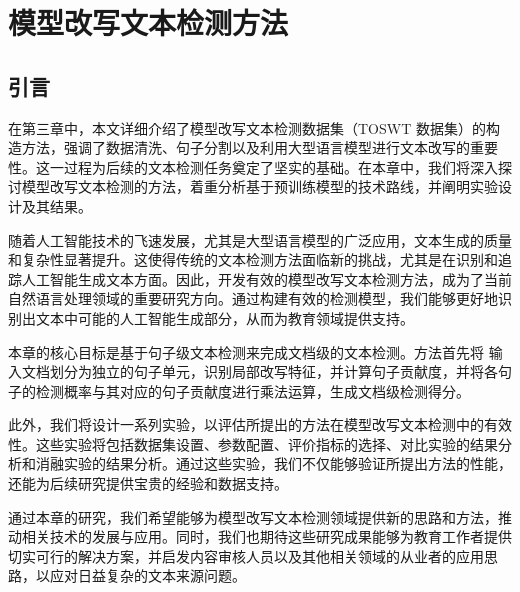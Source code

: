 
\chapter{模型改写文本检测方法}
\label{chap:method}

\section{引言}
\label{sec:method-intro}

在第三章中，本文详细介绍了模型改写文本检测数据集（TOSWT 数据集）的构造方法，强调了数据清洗、句子分割以及利用大型语言模型进行文本改写的重要性。这一过程为后续的文本检测任务奠定了坚实的基础。在本章中，我们将深入探讨模型改写文本检测的方法，着重分析基于预训练模型的技术路线，并阐明实验设计及其结果。

随着人工智能技术的飞速发展，尤其是大型语言模型的广泛应用，文本生成的质量和复杂性显著提升。这使得传统的文本检测方法面临新的挑战，尤其是在识别和追踪人工智能生成文本方面。因此，开发有效的模型改写文本检测方法，成为了当前自然语言处理领域的重要研究方向。通过构建有效的检测模型，我们能够更好地识别出文本中可能的人工智能生成部分，从而为教育领域提供支持。

本章的核心目标是基于句子级文本检测来完成文档级的文本检测。方法首先将
输入文档划分为独立的句子单元，识别局部改写特征，并计算句子贡献度，并将各句子的检测概率与其对应的句子贡献度进行乘法运算，生成文档级检测得分。

此外，我们将设计一系列实验，以评估所提出的方法在模型改写文本检测中的有效性。这些实验将包括数据集设置、参数配置、评价指标的选择、对比实验的结果分析和消融实验的结果分析。通过这些实验，我们不仅能够验证所提出方法的性能，还能为后续研究提供宝贵的经验和数据支持。

通过本章的研究，我们希望能够为模型改写文本检测领域提供新的思路和方法，推动相关技术的发展与应用。同时，我们也期待这些研究成果能够为教育工作者提供切实可行的解决方案，并启发内容审核人员以及其他相关领域的从业者的应用思路，以应对日益复杂的文本来源问题。



